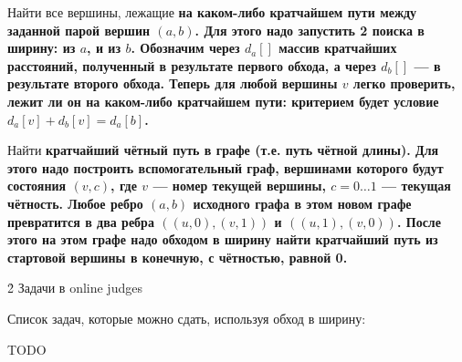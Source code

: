 {\li Найти все вершины, лежащие \bf{на каком-либо кратчайшем пути} между заданной парой вершин $(a,b)$. Для этого надо запустить 2 поиска в ширину: из $a$, и из $b$. Обозначим через $d_a[]$ массив кратчайших расстояний, полученный в результате первого обхода, а через $d_b[]$ --- в результате второго обхода. Теперь для любой вершины $v$ легко проверить, лежит ли он на каком-либо кратчайшем пути: критерием будет условие $d_a[v] + d_b[v] = d_a[b]$.

\li Найти \bf{кратчайший чётный путь} в графе (т.е. путь чётной длины). Для этого надо построить вспомогательный граф, вершинами которого будут состояния $(v,c)$, где $v$ --- номер текущей вершины, $c = 0 \ldots 1$ --- текущая чётность. Любое ребро $(a,b)$ исходного графа в этом новом графе превратится в два ребра $((u,0),(v,1))$ и $((u,1),(v,0))$. После этого на этом графе надо обходом в ширину найти кратчайший путь из стартовой вершины в конечную, с чётностью, равной 0.

}



\h2{ Задачи в online judges }

Список задач, которые можно сдать, используя обход в ширину:

TODO